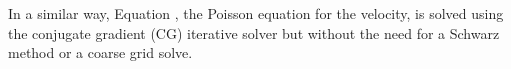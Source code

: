 \documentclass{sig-alternate}
\begin{document}
In a similar way, Equation , the Poisson equation for the velocity, is solved using the conjugate gradient (CG) iterative solver but without the need for a Schwarz method or a coarse grid solve.
\end{document}
